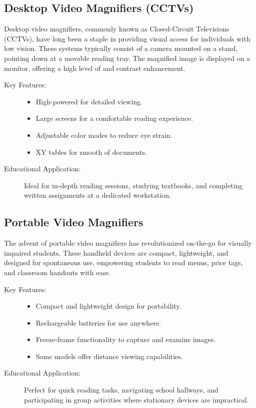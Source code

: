\subsection{Desktop Video Magnifiers (CCTVs)}
Desktop video magnifiers, commonly known as Closed-Circuit Televisions (CCTVs), have long been a staple in providing visual access for individuals with low vision. These systems typically consist of a camera mounted on a stand, pointing down at a movable reading tray. The magnified image is displayed on a monitor, offering a high level of  and contrast enhancement.\supercite{AFBMagnification}

\begin{description}
	\item[Key Features:]
	      \begin{itemize}
		      \item High-powered  for detailed viewing.
		      \item Large screens for a comfortable reading experience.
		      \item Adjustable color modes to reduce eye strain.
		      \item XY tables for smooth  of documents.
	      \end{itemize}
	\item[Educational Application:] Ideal for in-depth reading sessions, studying textbooks, and completing written assignments at a dedicated workstation.
\end{description}

\subsection{Portable Video Magnifiers}
The advent of portable video magnifiers has revolutionized on-the-go  for visually impaired students. These handheld devices are compact, lightweight, and designed for spontaneous use, empowering students to read menus, price tags, and classroom handouts with ease.\supercite{AFBMagnification}

\begin{description}
	\item[Key Features:]
	      \begin{itemize}
		      \item Compact and lightweight design for portability.
		      \item Rechargeable batteries for use anywhere.
		      \item Freeze-frame functionality to capture and examine images.
		      \item Some models offer distance viewing capabilities.
	      \end{itemize}
	\item[Educational Application:] Perfect for quick reading tasks, navigating school hallways, and participating in group activities where stationary devices are impractical.
\end{description}


